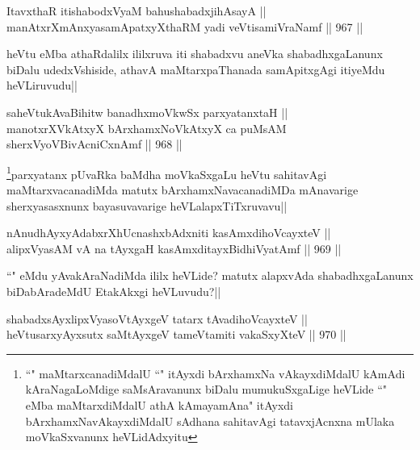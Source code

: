 
\begin{shl}
ItavxthaR itishabodxV\s yaM bahushabadxjihAsayA || \\
manAtxrXmAnxyasamApatxyXthaRM yadi veVtisamiVraNamf ||  967 ||  
\end{shl}

\begin{artha}
heVtu eMba athaRdalilx ililxruva iti shabadxvu aneVka shabadhxgaLanunx biDalu udedxVshiside, athavA maMtarxpaThanada samApitxgAgi itiyeMdu heVLiruvudu||
\end{artha}


\begin{shl}
saheVtukAvaBihitw banadhxmoVkwSx parxyatanxtaH || \\
manotxrXVkAtxyX bArxhamxNoVkAtxyX ca puMsAM sherxVyoVBivAcniCxnAmf ||  968 ||  
\end{shl}

\begin{artha}
\footnote{``\stext" maMtarxcanadiMdalU ``\stext" itAyxdi bArxhamxNa vAkayxdiMdalU kAmAdi kAraNagaLoMdige saMsAravanunx biDalu mumukuSxgaLige heVLide ``\stext" eMba maMtarxdiMdalU athA kAmayamAna" itAyxdi bArxhamxNavAkayxdiMdalU sAdhana sahitavAgi tatavxjAcnxna mUlaka moVkaSxvanunx heVLidAdxyitu}parxyatanx pUvaRka baMdha moVkaSxgaLu heVtu sahitavAgi maMtarxvacanadiMda matutx bArxhamxNavacanadiMDa mAnavarige sherxyasasxnunx bayasuvavarige heVLalapxTiTxruvavu||
\end{artha}


\begin{shl}
nAnudhAyxyAdabxrXhUcnashxbAdxniti kasAmxdihoVcayxteV || \\
alipxVyasAM vA na tAyxgaH kasAmxditayxBidhiVyatAmf ||  969 ||  
\end{shl}

\begin{artha}
``\stext" eMdu yAvakAraNadiMda ililx heVLide? matutx alapxvAda shabadhxgaLanunx biDabAradeMdU EtakAkxgi heVLuvudu?||
\end{artha}


\begin{shl}
shabadxsAyxlipxVyasoV\s tAyxgeV tatarx tAvadihoVcayxteV || \\
heVtusarxyAyxsutx saMtAyxgeV tameVtamiti vakaSxyXteV ||  970 ||  
\end{shl}


